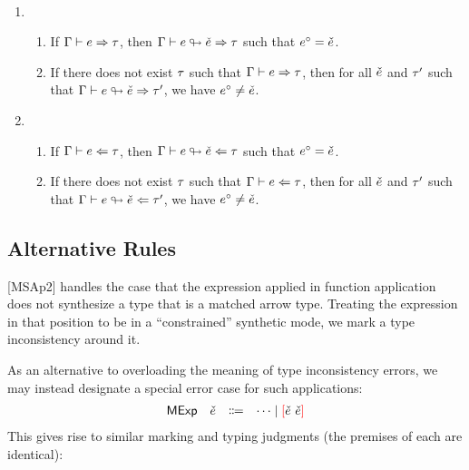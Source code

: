 \documentclass{article}
\begin{document}
\begin{theorem}[name=?] \
  \begin{enumerate}
    \item \begin{enumerate}
        \item If $\Gamma \vdash e \Rightarrow \tau$, then $\Gamma \vdash e \looparrowright \check{e} \Rightarrow \tau$
          such that $e^{\circ} = \check{e}$.
        \item If there does not exist $\tau$ such that $\Gamma \vdash e \Rightarrow \tau$, then for all
          $\check{e}$ and $\tau'$ such that $\Gamma \vdash e \looparrowright \check{e} \Rightarrow \tau'$, we have
          $e^{\circ} \neq \check{e}$.
      \end{enumerate}

    \item \begin{enumerate}
        \item If $\Gamma \vdash e \Leftarrow \tau$, then $\Gamma \vdash e \looparrowright \check{e} \Leftarrow \tau$
          such that $e^{\circ} = \check{e}$.
        \item If there does not exist $\tau$ such that $\Gamma \vdash e \Leftarrow \tau$, then for all
          $\check{e}$ and $\tau'$ such that $\Gamma \vdash e \looparrowright \check{e} \Leftarrow \tau'$, we have
          $e^{\circ} \neq \check{e}$.
      \end{enumerate}
  \end{enumerate}
\end{theorem}

\subsection{Alternative Rules}
[MSAp2] handles the case that the expression applied in function application does not synthesize a
type that is a matched arrow type. Treating the expression in that position to be in a
``constrained'' synthetic mode, we mark a type inconsistency around it.

As an alternative to overloading the meaning of type inconsistency errors, we may instead designate
a special error case for such applications:
%
\[\begin{array}{rrcl}
  {\normalfont\textsf{MExp}} & \check{e} & \Coloneqq & \cdots \mid \textcolor{red}{[}\check{e} ~\check{e}\textcolor{red}{]}
\end{array}\]
%
This gives rise to similar marking and typing judgments (the premises of each are identical):
%
\begin{mathpar}
  \judgment{
    \ctxSynFixedInto{\ctx}{\EMV_1}{\ECMV_1}{\TMV} \\
    \notMatchedArrow{\TMV}{\TMV_1}{\TMV_2} \\
    \ctxAnaFixedInto{\ctx}{\EMV_2}{\ECMV_2}{\TUnknown}
  }{
    \ctxSynFixedInto{\ctx}{\EAp{\EMV_1}{\EMV_2}}{\ECNonMatchedAp{\ECMV_1}{\ECMV_2}}{\TUnknown}
  }{ISAp2'}

\end{mathpar}
\end{document}
